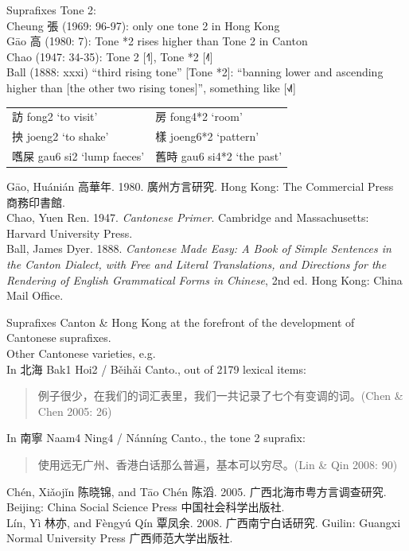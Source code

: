 \documentclass{beamer}
\begin{document}
\begin{frame}[fragile]{Suprafixes}
Tone 2:\\
Cheung 張 (1969: 96-97): only one tone 2 in Hong Kong\\
Gāo 高 (1980: 7): Tone *2 rises higher than Tone 2 in Canton\\
Chao (1947: 34-35): Tone 2 [˧˥], Tone *2 [˨˥]\\
Ball (1888: xxxi) \enquote{third rising tone} [Tone *2]: \enquote{banning lower and ascending higher than [the other two rising tones]}, something like [˧˩˥]\\
\begin{table}
\flushleft
\begin{tabular}{l l}
    訪 fong2 \enquote*{to visit} & 房 fong4*2 \enquote*{room}\\
    抰 joeng2 \enquote*{to shake} & 樣 joeng6*2 \enquote*{pattern}\\
    嚿屎 gau6 si2 \enquote*{lump faeces} & 舊時 gau6 si4*2 \enquote*{the past}\\
\end{tabular}
\end{table}

\vfill {} {\tiny Gāo, Huánián 高華年. 1980. 廣州方言研究. Hong Kong: The Commercial
Press 商務印書館.\\
Chao, Yuen Ren. 1947. \emph{Cantonese Primer}. Cambridge and Massachusetts: Harvard University Press.\\
Ball, James Dyer. 1888. \emph{Cantonese Made Easy: A Book of Simple Sentences in the Canton Dialect, with Free and Literal Translations, and
Directions for the Rendering of English Grammatical Forms in Chinese}, 2nd ed. Hong Kong: China Mail Office.}

\end{frame}

\begin{frame}[fragile]{Suprafixes}
Canton \& Hong Kong at the forefront of the development of Cantonese suprafixes.\\
\bigskip
Other Cantonese varieties, e.g.\\
\smallskip
In 北海 Bak1 Hoi2 / Běihǎi Canto., out of 2179 lexical items:\\
\begin{quote}例子很少，在我们的词汇表里，我们一共记录了七个有变调的词。{\scriptsize (Chen \& Chen 2005: 26)} \end{quote}
\smallskip
In 南寧 Naam4 Ning4 / Nánníng Canto., the tone 2 suprafix:\\
\begin{quote}使用远无广州、香港白话那么普遍，基本可以穷尽。{\scriptsize (Lin \& Qin 2008: 90)}\end{quote}

\vfill {} {\tiny Chén, Xiǎojǐn 陈晓锦, and Tāo Chén 陈滔. 2005. 广西北海市粤方言调查研究. Beijing: China Social Science Press 中国社会科学出版社.\\
Lín, Yì 林亦, and Fèngyú Qín 覃凤余. 2008. 广西南宁白话研究.
Guilin: Guangxi Normal University Press 广西师范大学出版社.}

\end{frame}
\end{document}
